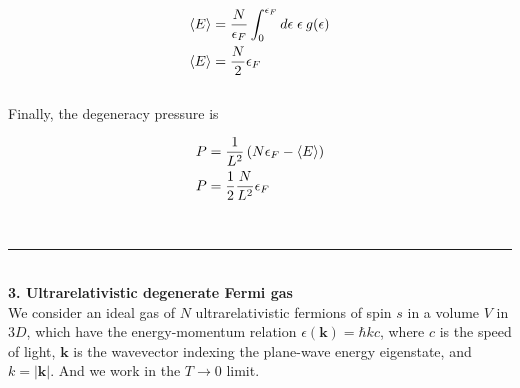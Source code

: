 \documentclass[]{article}
\begin{document}
\begin{enumerate}[i.]
\begin{equation}\label{eq:18}
\begin{aligned}
\expval{E} & =  \frac{N}{\epsilon_F} \int_0^{\epsilon_F} d\epsilon \; \epsilon \: g(\epsilon) \\
\expval{E} & =  \frac{N}{2 } \epsilon_F \\
\end{aligned}
\end{equation} \\

Finally, the degeneracy pressure is

\begin{equation}\label{eq:19}
\begin{aligned}
P & = \frac{1}{L^2} \left( N \epsilon_F -  \expval{E}\right) \\
P & =  \frac{1}{2} \frac{N}{L^2}  \epsilon_F  \\
\end{aligned}
\end{equation} 

\end{enumerate}

\hfill \\
\noindent\rule{15cm}{0.4pt} \\


{\bf 3. Ultrarelativistic degenerate Fermi gas} \\

We consider an ideal gas of $N$ ultrarelativistic fermions of spin $s$ in a volume $V$ in $3D$, which have the energy-momentum relation $\epsilon(\bm{k}) = \hbar k c$, where $c$ is the speed of light, $\bm{k}$ is the wavevector indexing the plane-wave energy eigenstate, and $k = |\bm{k}|$. And we work in the $T\to 0$ limit. \\
\end{document}
